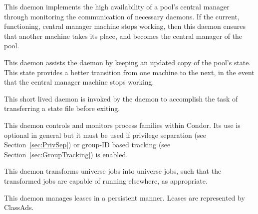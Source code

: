 \begin{description}
\item[\Condor{had}] This daemon
implements the high availability of a pool's central manager
through monitoring the communication of necessary daemons.
If the current, functioning, central manager machine
stops working, then this daemon ensures that another 
machine takes its place, and becomes the central manager of
the pool.

\item[\Condor{replication}] This daemon
assists the  daemon by keeping an updated copy of the
pool's state. This state provides a better transition
from one machine to the next, in the event 
that the central manager machine stops working.

\item[\Condor{transferer}] This short lived daemon is invoked by
the  daemon to accomplish the task of transferring
a state file before exiting.

\item[\Condor{procd}] This daemon
controls and monitors process families within Condor. Its use
is optional in general but it must be used if privilege separation
(see Section~\ref{sec:PrivSep}) or group-ID based tracking (see
Section~\ref{sec:GroupTracking}) is enabled.

\item[\Condor{job\_router}] This daemon 
transforms  universe jobs into 
universe jobs, such that the transformed jobs are capable
of running elsewhere, as appropriate.

\item[\Condor{lease\_manager}] This daemon 
manages leases in a persistent manner.
Leases are represented by ClassAds.


\end{description}
